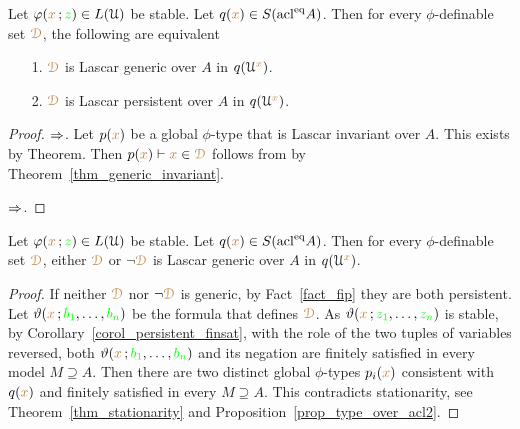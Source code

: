 \begin{proposition}\label{prop_stable_genericiffpersistent}
  Let $\varphi({\color{brown} x}\,;{\color{green} z})\in L(\EuScript U)$ be stable.
  Let $q({\color{brown} x})\in S(\mathop{\rm acl}^{{\rm eq}}\!A)$.
  Then for every $\phi$-definable set ${\color{brown}\EuScript D}$, the following are equivalent
  \begin{itemize}
    \item[1.] ${\color{brown}\EuScript D}$ is Lascar generic over $A$ in $q(\EuScript U^{\color{brown} x})$.
    \item[2.] ${\color{brown}\EuScript D}$ is Lascar persistent over $A$ in $q(\EuScript U^{\color{brown} x})$.
  \end{itemize}
\end{proposition}

\begin{proof}
  $\Rightarrow$.
  Let $p({\color{brown} x})$ be a global $\phi$-type that is Lascar invariant over $A$.
  This exists by Theorem.
  Then $p({\color{brown} x})\vdash{\color{brown}x}\in{\color{brown}\EuScript D}$ follows from  by Theorem~\ref{thm_generic_invariant}.

  $\Rightarrow$.
  
\end{proof}

\begin{corollary}\label{corol_stable_generic}
  Let $\varphi({\color{brown} x}\,;{\color{green} z})\in L(\EuScript U)$ be stable.
  Let $q({\color{brown} x})\in S(\mathop{\rm acl}^{{\rm eq}}\!A)$.
  Then for every $\phi$-definable set ${\color{brown}\EuScript D}$, either ${\color{brown}\EuScript D}$ or $\neg{\color{brown}\EuScript D}$ is Lascar generic over $A$ in $q(\EuScript U^{\color{brown} x})$.
\end{corollary}

\begin{proof}
  If neither ${\color{brown}\EuScript D}$ nor $\neg{\color{brown}\EuScript D}$ is generic, by Fact~\ref{fact_fip} they are both persistent.
  Let $\vartheta({\color{brown} x}\,;{\color{green} b_1},\dots,{\color{green} b_n})$ be the formula that defines ${\color{brown}\EuScript D}$.
  As $\vartheta({\color{brown} x}\,;{\color{green} z_1},\dots,{\color{green} z_n})$ is stable, by Corollary~\ref{corol_persistent_finsat}, with the role of the two tuples of variables reversed, both $\vartheta({\color{brown} x}\,;{\color{green} b_1},\dots,{\color{green} b_n})$ and its negation are finitely satisfied in every model $M\supseteq A$.
  Then there are two distinct global $\phi$-types $p_i({\color{brown} x})$ consistent with $q({\color{brown} x})$ and finitely satisfied in every $M\supseteq A$.
  This contradicts stationarity, see Theorem~\ref{thm_stationarity} and Proposition~\ref{prop_type_over_acl2}.
\end{proof}



